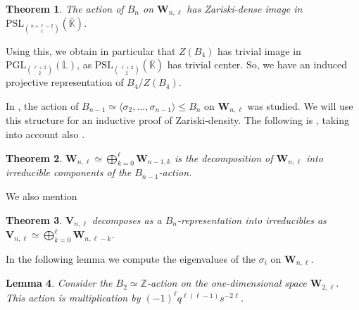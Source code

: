 \documentclass[letterpaper]{amsart}
\newtheorem{theorem}{Theorem}[section]
\newtheorem{lemma}[theorem]{Lemma}
\begin{document}
\begin{theorem}
\label{Knizhinik Zamolodichikov Zariski density}
    The action of $B_n$ on $\textbf{W}_{n,\ell}$ has Zariski-dense image in $\mathrm{PSL}_{\binom{n + \ell - 2}{\ell}}(\bar{\mathbb{K}})$.
\end{theorem}
Using this, we obtain in particular that $Z(B_4)$ has trivial image in $\mathrm{PGL}_{\binom{\ell + 2}{2}}(\mathbb{L})$, as $\mathrm{PSL}_{\binom{\ell + 2}{2}}(\bar{\mathbb{K}})$ has trivial center. So, we have an induced projective representation of $B_4/Z(B_4)$.

In \cite{jackson2011lawrence}, the action of $B_{n-1} \simeq \langle\sigma_2, \dots, \sigma_{n-1} \rangle  \leq B_n$ on $\textbf{W}_{n,\ell}$ was studied. We will use this structure for an inductive proof of Zariski-density. The following is \cite[Lemma 16]{jackson2011lawrence}, taking into account also \cite[Theorem 3]{jackson2011lawrence}.
\begin{theorem}
\label{Irreducible Decomposition of Bn-1}
    $\textbf{W}_{n,\ell} \simeq \bigoplus_{k=0}^\ell \textbf{W}_{n-1,k}$ is the decomposition of $\textbf{W}_{n,\ell}$ into irreducible components of the $B_{n-1}$-action.
\end{theorem}
We also mention \cite[Lemma 13]{jackson2011lawrence}
\begin{theorem}
\label{Vn,l irreducible decomposition}
$\textbf{V}_{n, \ell}$ decomposes as a $B_n$-representation into irreducibles as $\textbf{V}_{n, \ell} \simeq \bigoplus_{k=0}^\ell \textbf{W}_{n, \ell-k}$.
\end{theorem}
In the following lemma we compute the eigenvalues of the $\sigma_i$ on $\textbf{W}_{n, \ell}$.
\begin{lemma}
\label{Eigenvalue computation}
    Consider the $B_2 \simeq \mathbb{Z}$-action on the one-dimensional space $\textbf{W}_{2,\ell}$. This action is multiplication by $(-1)^\ell q^{\ell(\ell-1)}s^{-2\ell}$.
\end{lemma}
\end{document}
